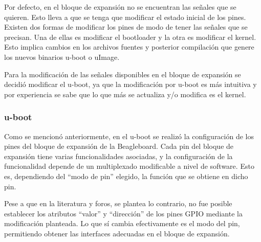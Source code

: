 \documentclass[%
        final,
        notitlepage,
        narroweqnarray,
        inline,
        ]{ieee}
\begin{document}
Por defecto, en el bloque de expansión no se encuentran las señales que se quieren. Esto 
lleva a que se tenga que modificar el estado inicial de los pines. 
Existen dos formas de modificar los pines de modo de tener las señales que se precisan. Una de ellas es modificar el bootloader y la otra es modificar el kernel. Esto implica cambios en los archivos fuentes y posterior compilación que genere los nuevos binarios u-boot o uImage. 


Para la modificación de las señales disponibles en el bloque de expansión se decidió modificar el u-boot, ya que la modificación por u-boot es más intuitiva y por experiencia se sabe que lo que más se actualiza y/o modifica es el kernel. 

\subsubsection{u-boot}
Como se mencionó anteriormente, en el u-boot se realizó la configuración de los pines del bloque de expansión de la Beagleboard. 
Cada pin del bloque de expansión tiene varias funcionalidades asociadas, y la configuración de la 
funcionalidad depende de un multiplexado modificable a nivel de software. Esto es, dependiendo del “modo de pin” elegido, la función que se obtiene en dicho pin.
%

%
%



Pese a que en la literatura y foros, se plantea lo contrario, no fue posible establecer los atributos “valor” y “dirección” de los pines GPIO mediante la modificación planteada. Lo que sí cambia efectivamente es el modo del pin, permitiendo obtener las interfaces adecuadas en el bloque de expansión.
\end{document}
